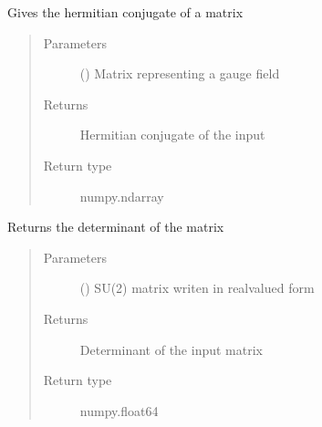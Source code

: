 \documentclass[letterpaper,10pt,english]{sphinxmanual}
\begin{document}
\begin{fulllineitems}
\label{\detokenize{index:su2.dagger}}
Gives the hermitian conjugate of a matrix
\begin{quote}\begin{description}
\item[{Parameters}] \leavevmode
{} () \textendash{} Matrix representing a gauge field

\item[{Returns}] \leavevmode
Hermitian conjugate of the input

\item[{Return type}] \leavevmode
numpy.ndarray

\end{description}\end{quote}

\end{fulllineitems}


\begin{fulllineitems}
\label{\detokenize{index:su2.det}}
Returns the determinant of the matrix
\begin{quote}\begin{description}
\item[{Parameters}] \leavevmode
{} () \textendash{} SU(2) matrix writen in real\sphinxhyphen{}valued form

\item[{Returns}] \leavevmode
Determinant of the input matrix

\item[{Return type}] \leavevmode
numpy.float64

\end{description}\end{quote}

\end{fulllineitems}

\end{document}
